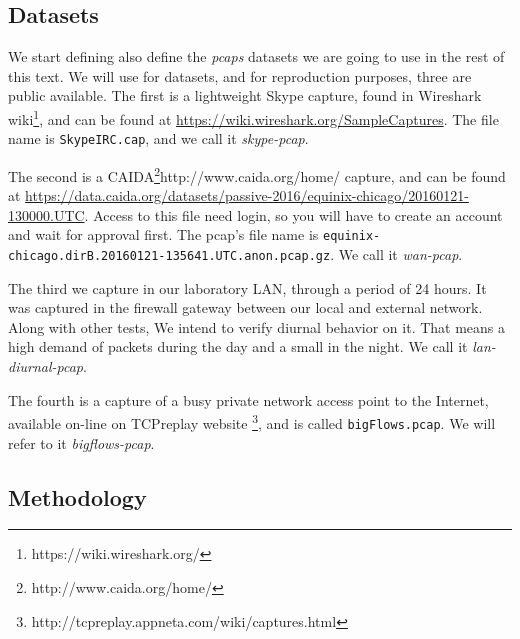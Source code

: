 \subsection{Datasets}

We start defining also define the \textit{pcaps} datasets we are going to use in the rest of this text. We will use for datasets, and for reproduction purposes, three are public available. 
The first is a lightweight Skype capture, found in  Wireshark wiki\footnote{https://wiki.wireshark.org/}, and can be found at \href{https://wiki.wireshark.org/SampleCaptures}{https://wiki.wireshark.org/SampleCaptures}. The file name is \texttt{SkypeIRC.cap}, and we call it \textit{skype-pcap}.

The second is a CAIDA\footnote{http://www.caida.org/home/}{http://www.caida.org/home/} capture, and can be found at  \href{https://data.caida.org/datasets/passive-2016/equinix-chicago/20160121-130000.UTC}{https://data.caida.org/datasets/passive-2016/equinix-chicago/20160121-130000.UTC}. Access to this file need login, so you will have to create an account and wait for approval first. The pcap's file name is \texttt{equinix-chicago.dirB.20160121-135641.UTC.anon.pcap.gz}. We call it \textit{wan-pcap}.

The third we capture in our laboratory LAN, through a period of 24 hours. It was captured in the firewall gateway between our local and external network. Along with other tests, We intend to verify diurnal behavior on it. That means a high demand of packets during the day and a small in the night. We call it \textit{lan-diurnal-pcap}.

The fourth is a capture of a busy private network access point to the Internet, available on-line on TCPreplay\cite{web-tcpreplay} website \footnote{ http://tcpreplay.appneta.com/wiki/captures.html}, and is called \texttt{bigFlows.pcap}. We will refer to it \textit{bigflows-pcap}.



\subsection{Methodology}

